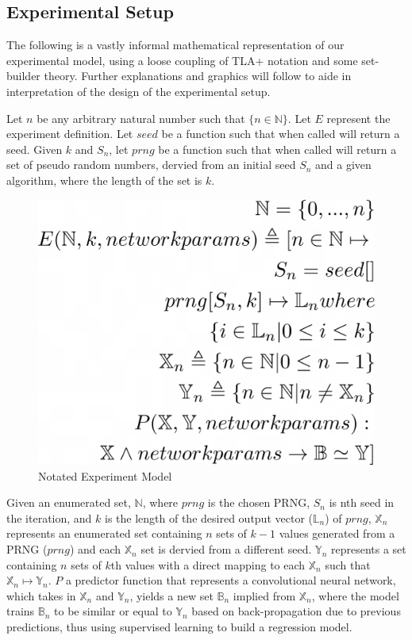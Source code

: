 \documentclass[conference]{IEEEtran}
\begin{document}
\subsection{Experimental Setup}


The following is a vastly informal mathematical representation of our experimental model, using a loose coupling of TLA+ notation and some set-builder theory. Further explanations and graphics will follow to aide in interpretation of the design of the experimental setup.

\begin{displayquote}
Let $n$ be any arbitrary natural number such that $\{n \in \mathbb{N}\}$.
Let $E$ represent the experiment definition.
Let $seed$ be a function such that when called will return a seed.
Given $k$ and $S_n$, let $prng$ be a function such that when called will return a set of pseudo random numbers,
dervied from an initial seed $S_n$ and a given algorithm, where the length of the set is $k$.
\end{displayquote}

\begin{figure}[H]
\centering
\includegraphics[width=.5\linewidth]{./Images/ModelNotated.png}
\caption{Notated Experiment Model}
\label{fig:Notated Experiment Model}
\end{figure}


Given an enumerated set, $\mathbb{N}$,
where $prng$ is the chosen PRNG, $S_n$ is nth seed in the iteration, and $k$ is the length of the desired output vector ($\mathbb{L}_n$) of $prng$,
$\mathbb{X}_n$ represents an enumerated set containing $n$ sets of $k-1$ values generated from a PRNG ($prng$) and each $\mathbb{X}_n$ set is dervied from a different seed. $\mathbb{Y}_n$ represents a set containing $n$ sets of $k$th values with a direct mapping to each $\mathbb{X}_n$ such that $\mathbb{X}_n \mapsto \mathbb{Y}_n$. $P$ a predictor function that represents a convolutional neural network, which takes in $\mathbb{X}_n$ and $\mathbb{Y}_n$, yields a new set $\mathbb{B}_n$ implied from $\mathbb{X}_n$, where the model trains $\mathbb{B}_n$ to be similar or equal to $\mathbb{Y}_n$ based on back-propagation due to previous predictions, thus using supervised learning to build a regression model.
\end{document}
